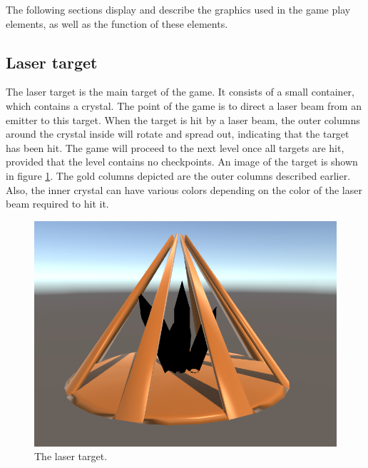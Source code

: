 		The following sections display and describe the graphics used in the 
		game play elements, as well as the function of these elements.
		
		\subsection{Laser target} \label{ssec:lasertarget}
			The laser target is the main target of the game. It consists of
			a small container, which contains a crystal. The point of the
			game is to direct a laser beam from an emitter to this target.
			When the target is hit by a laser beam, the outer columns around
			the crystal inside will rotate and spread out, indicating that
			the target has been hit. The game will proceed to the
			next level once all targets are hit, provided that the level contains 
			no checkpoints. An image of the target is shown in figure 
			\ref{fig:target}. The gold columns depicted are the outer columns
			described earlier. Also, the inner crystal can have various colors 
			depending on the color of the laser beam required to hit it.
			\begin{figure}[!ht]
				\centering
				\includegraphics[scale = 0.4]{Target}
				\caption{The laser target.}
				\label{fig:target}
			\end{figure}
			
